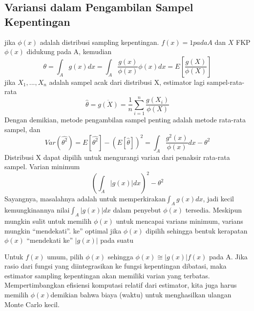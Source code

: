 \documentclass[a4paper,12pt]{article}
\theoremstyle{definition}
\begin{document}
    \subsection{Variansi dalam Pengambilan Sampel Kepentingan}
    jika $\phi(x)$ adalah distribusi sampling kepentingan. $f(x)=1 pada A$ dan $X$ FKP $\phi(x)$ didukung pada A, kemudian
    \begin{equation*}
        \theta=\int_{A}g(x)dx= \int_{A}\frac{g(x)}{\phi(x)}\phi (x)dx=E\left [ \frac{g(X)}{\phi(X)} \right ]
    \end{equation*}
    jika $X_{1},...,X_{n}$ adalah sampel acak dari distribusi X, estimator lagi sampel-rata-rata
    \begin{equation*}
        \widehat{\theta}=\overline{g(X)}=\frac{1}{n}\sum_{i=1}^{n}\frac{g(X_{i})}{\phi(X)}
    \end{equation*}
    Dengan demikian, metode pengambilan sampel penting adalah metode rata-rata sampel, dan
    \begin{equation*}
        Var(\widehat{\theta^{2}})=E[\widehat{\theta^{2}}]-(E[\widehat{\theta}])^{2}=\int_{A}\frac{g^{2}(x)}{\phi(x)}dx-\theta^{2} 
    \end{equation*}
    Distribusi X dapat dipilih untuk mengurangi varian dari penaksir rata-rata sampel. Varian minimum
    \begin{equation*}
        \left ( \int_{A}\left | g(x) \right |dx \right )^{2}-\theta^{2}
    \end{equation*}
    Sayangnya, masalahnya adalah untuk memperkirakan$\int _{A}g(x)dx$, jadi kecil kemungkinannya nilai$\int _{A}\left | g(x) \right |dx$ dalam penyebut $\phi(x)$ tersedia. Meskipun mungkin sulit untuk memilih $\phi(x)$ untuk mencapai varians minimum, varians mungkin “mendekati”. ke” optimal jika $\phi(x)$ dipilih sehingga bentuk kerapatan $\phi(x)$ “mendekati ke” $|g(x)|$ pada suatu

    Untuk $f(x)$ umum, pilih $\phi(x)$ sehingga $\phi(x)\cong \left | g(x) \right |f(x)$ pada A. Jika rasio dari fungsi yang diintegrasikan ke fungsi kepentingan dibatasi, maka estimator sampling kepentingan akan memiliki varian yang terbatas. Mempertimbangkan efisiensi komputasi relatif dari estimator, kita juga harus memilih $\phi(x)$demikian bahwa biaya (waktu) untuk menghasilkan ulangan Monte Carlo kecil.
\end{document}
